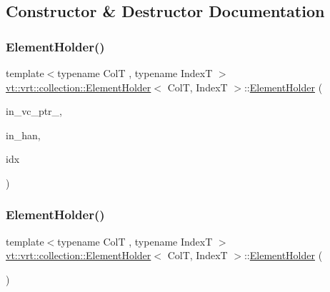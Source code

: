 \subsection{Constructor \& Destructor Documentation}
\mbox{\label{structvt_1_1vrt_1_1collection_1_1_element_holder_aff59f3b22c3f4c81daa68924bab65817}} 
\subsubsection{\texorpdfstring{Element\+Holder()}{ElementHolder()}\hspace{0.1cm}{\footnotesize\ttfamily [1/2]}}
{\footnotesize\ttfamily template$<$typename ColT , typename IndexT $>$ \\
\hyperlink{structvt_1_1vrt_1_1collection_1_1_element_holder}{vt\+::vrt\+::collection\+::\+Element\+Holder}$<$ ColT, IndexT $>$\+::\hyperlink{structvt_1_1vrt_1_1collection_1_1_element_holder}{Element\+Holder} (\begin{DoxyParamCaption}\item[{\hyperlink{structvt_1_1vrt_1_1collection_1_1_element_holder_afc12d1a71ec8f735f1b7fe12a067c8a6}{Virtual\+Ptr\+Type}}]{in\+\_\+vc\+\_\+ptr\+\_\+,  }\item[{\hyperlink{namespacevt_af64846b57dfcaf104da3ef6967917573}{Handler\+Type} const}]{in\+\_\+han,  }\item[{IndexT const \&}]{idx }\end{DoxyParamCaption})}

\mbox{\label{structvt_1_1vrt_1_1collection_1_1_element_holder_acc214e54954edc0d8112c59ea7e51c02}} 
\subsubsection{\texorpdfstring{Element\+Holder()}{ElementHolder()}\hspace{0.1cm}{\footnotesize\ttfamily [2/2]}}
{\footnotesize\ttfamily template$<$typename ColT , typename IndexT $>$ \\
\hyperlink{structvt_1_1vrt_1_1collection_1_1_element_holder}{vt\+::vrt\+::collection\+::\+Element\+Holder}$<$ ColT, IndexT $>$\+::\hyperlink{structvt_1_1vrt_1_1collection_1_1_element_holder}{Element\+Holder} (\begin{DoxyParamCaption}\item[{\hyperlink{structvt_1_1vrt_1_1collection_1_1_element_holder}{Element\+Holder}$<$ ColT, IndexT $>$ \&\&}]{ }\end{DoxyParamCaption})\hspace{0.3cm}{\ttfamily [default]}}

